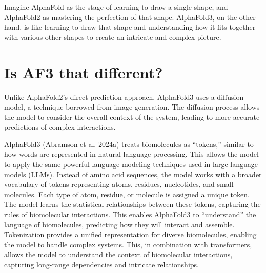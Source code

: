 \documentclass[
]{scrbook}
\begin{document}
Imagine AlphaFold as the stage of learning to draw a single shape, and
AlphaFold2 as mastering the perfection of that shape. AlphaFold3, on the
other hand, is like learning to draw that shape and understanding how it
fits together with various other shapes to create an intricate and
complex picture.

\section{Is AF3 that different?}\label{is-af3-that-different}

Unlike AlphaFold2's direct prediction approach, AlphaFold3 uses a
diffusion model, a technique borrowed from image generation. The
diffusion process allows the model to consider the overall context of
the system, leading to more accurate predictions of complex
interactions.

AlphaFold3 (Abramson et al. 2024a) treats biomolecules as ``tokens,''
similar to how words are represented in natural language processing.
This allows the model to apply the same powerful language modeling
techniques used in large language models (LLMs). Instead of amino acid
sequences, the model works with a broader vocabulary of tokens
representing atoms, residues, nucleotides, and small molecules. Each
type of atom, residue, or molecule is assigned a unique token. The model
learns the statistical relationships between these tokens, capturing the
rules of biomolecular interactions. This enables AlphaFold3 to
``understand'' the language of biomolecules, predicting how they will
interact and assemble. Tokenization provides a unified representation
for diverse biomolecules, enabling the model to handle complex systems.
This, in combination with transformers, allows the model to understand
the context of biomolecular interactions, capturing long-range
dependencies and intricate relationships.
\end{document}

